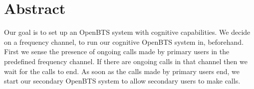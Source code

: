 \chapter*{\centering Abstract}

Our goal is to set up an OpenBTS system with cognitive capabilities. We decide on a frequency channel, to run our cognitive OpenBTS system in, beforehand. First we sense the presence of ongoing calls made by primary users in the predefined frequency channel. If there are ongoing calls in that channel then we wait for the calls to end. As soon as the calls made by primary users end, we start our secondary OpenBTS system to allow secondary users to make calls.